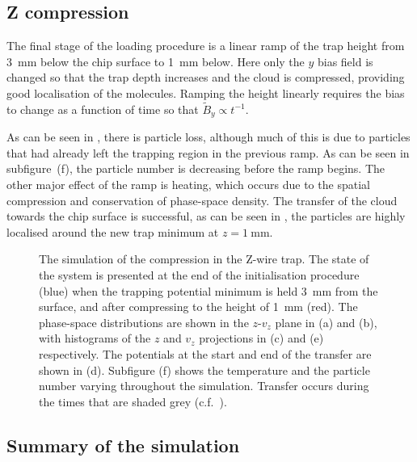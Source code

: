 \subsection{Z compression}

The final stage of the loading procedure is a linear ramp of the trap height
from \SI{3}{\milli\meter} below the chip surface to \SI{1}{\milli\meter} below.
Here only the $y$ bias field is changed so  that the trap depth
increases and the cloud is compressed, providing good localisation of the
molecules. Ramping the height linearly requires the bias to change as a
function of time so that $\tilde{B}_{y} \propto t^{-1}$.

As can be seen in , there is particle loss,
although much of this is due to particles that had already left the trapping
region in the previous ramp. As can be seen in subfigure~(f), the particle
number is decreasing before the ramp begins. The other major effect of the ramp
is heating, which occurs due to the spatial compression and conservation of
phase-space density.
%
The transfer of the cloud towards the chip surface is successful, as can be seen
in , the particles are highly localised around the
new trap minimum at $z=\SI{1}{\milli\meter}$.

\begin{figure}[p]
\centering
  \caption[Simulation of compression in Z-trap]{
    The simulation of the compression in the Z-wire trap. The state of the
    system is presented at the end of the initialisation procedure (blue) when
    the trapping potential minimum is held \SI{3}{\milli\meter} from the
    surface, and after compressing to the height of \SI{1}{\milli\meter} (red).
    The phase-space distributions are shown in the $z$-$v_z$ plane in (a) and
    (b), with histograms of the $z$ and $v_z$ projections in (c) and (e)
    respectively. The potentials at the start and end of the transfer are shown
    in (d). Subfigure (f) shows the temperature and the particle number varying
    throughout the simulation. Transfer occurs during the times that are shaded
    grey (c.f.~).
  }
  \label{sim:fig:zsim}
\end{figure}

\subsection{Summary of the simulation}

